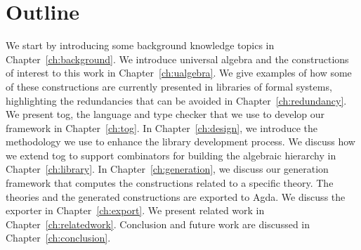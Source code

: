 \section{Outline}
We start by introducing some background knowledge topics in Chapter~\ref{ch:background}. 
We introduce universal algebra and the constructions of interest to this work in Chapter~\ref{ch:ualgebra}. 
We give examples of how some of these constructions are currently presented in libraries of formal systems, highlighting the redundancies that can be avoided in Chapter~\ref{ch:redundancy}. 
We present tog, the language and type checker that we use to develop our framework in Chapter~\ref{ch:tog}. 
In Chapter~\ref{ch:design}, we introduce the methodology we use to enhance the library development process. 
We discuss how we extend tog to support combinators for building the algebraic hierarchy in Chapter~\ref{ch:library}. 
In Chapter~\ref{ch:generation}, we discuss our generation framework that computes the constructions related to a specific theory.  
The theories and the generated constructions are exported to Agda. We discuss the exporter in Chapter~\ref{ch:export}. 
We present related work in Chapter~\ref{ch:relatedwork}. Conclusion and future work are discussed in Chapter~\ref{ch:conclusion}. 

